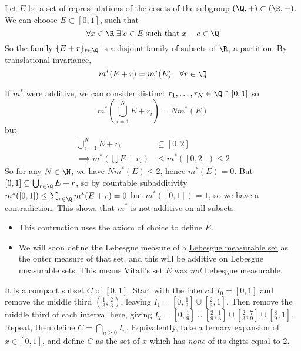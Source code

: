 \documentclass{article}
\newcommand{\1}[1]{\mathbbm{1}_{#1}}
\begin{document}
\begin{eg}
    Let $E$ be a set of representations of the cosets of the subgroup $(\Q, +) \subset (\R, +)$. We can choose $E \subset [0, 1]$, such that
    \begin{equation*}
        \forall x \in \R \; \exists! e \in E \; \text{such that} \; x - e \in \Q
    \end{equation*}
    So the family $\{E + r\}_{r \in \Q}$ is a disjoint family of subsets of $\R$, a partition.
    By translational invariance, \begin{equation*}m^*(E + r) = m^*(E) \quad \forall r \in \Q\end{equation*}

    If $m^*$ were additive, we can consider distinct $r_1, \dotsc, r_N \in \Q \cap [0, 1]$ so
    \begin{equation*}
        m^*\left(\bigcup_{i=1}^N E + r_i\right) = N m^*(E)
    \end{equation*}
    but
    \begin{align*}
        \bigcup_{i=1}^N E + r_i &\subseteq [0, 2] \\
        \implies m^*\left(\bigcup E + r_i\right) &\leq m^*([0, 2]) \leq 2
    \end{align*}
    So for any $N \in \N$, we have $N m^*(E) \leq 2$, hence $m^*(E) = 0$.
    But $[0, 1] \subseteq \bigcup_{r \in \Q} E + r$, so by countable subadditivity $m^*([0, 1]) \leq \sum_{r \in \Q} m^*(E + r) = 0$ but $m^*([0, 1]) = 1$, so we have a contradiction.
    This shows that $m^*$ is not additive on all subsets.
\end{eg}

\begin{remark} \leavevmode
    \begin{itemize}
        \item This contruction uses the axiom of choice to define $E$.
        \item We will soon define the Lebesgue measure of a \hyperlink{def:lebMAble}{Lebesgue measurable set} as the outer measure of that set, and this will be additive on Lebesgue measurable sets.  This means Vitali's set $E$ was \emph{not} Lebesgue measurable.
    \end{itemize}
\end{remark}

\begin{eg} 
    It is a compact subset $C$ of $[0, 1]$.  Start with the interval $I_0 = [0, 1]$ and remove the middle third $\left(\frac13, \frac23\right)$, leaving $I_1 = \left[0, \frac13\right] \cup \left[\frac23, 1\right]$.
    Then remove the middle third of each interval here, giving $I_2 = \left[0, \frac19\right] \cup \left[\frac29, \frac13\right] \cup \left[\frac23, \frac79\right] \cup \left[\frac89, 1\right]$.
    Repeat, then define $C = \bigcap_{n \geq 0} I_n$.
    Equivalently, take a ternary expansion of $x \in [0, 1]$, and define $C$ as the set of $x$ which has \emph{none} of its digits equal to $2$.
\end{eg}
\end{document}

